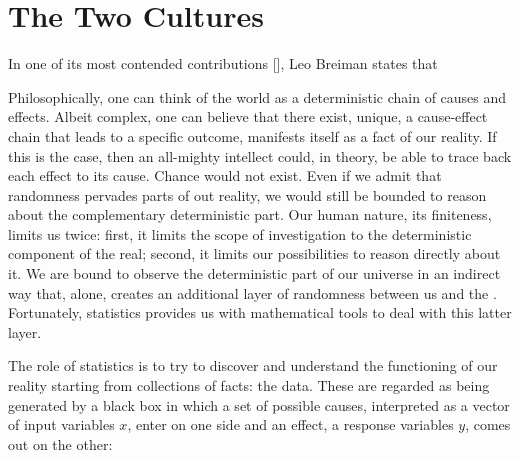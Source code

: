 \section{The Two Cultures} \label{sec:cultures}
In one of its most contended contributions [\cite{Breiman2001}], Leo Breiman states that
\begin{displayquote}
\end{displayquote}
Philosophically, one can think of the world as a deterministic chain of causes and effects. Albeit complex, one can believe that there exist, unique, a cause-effect chain that leads to a specific outcome, manifests itself as a fact of our reality. If this is the case, then  an all-mighty intellect could, in theory, be able to trace back each effect to its cause. Chance would not exist. Even if we admit that randomness pervades parts of out reality, we would still be bounded to reason about the complementary deterministic part. Our human nature, its finiteness, limits us twice: first, it limits the scope of investigation to the deterministic component of the real; second, it limits our possibilities to reason directly about it. We are bound to observe the deterministic part of our universe in an indirect way that, alone, creates an additional layer of randomness between us and the . Fortunately, statistics provides us with mathematical tools to deal with this latter layer.

The role of statistics is to try to discover and understand the functioning of our reality starting from collections of facts: the data. These are regarded as being generated by a black box in which a set of possible causes, interpreted as a vector of input variables $x$, enter on one side and an effect, a response variables $y$, comes out on the other:

